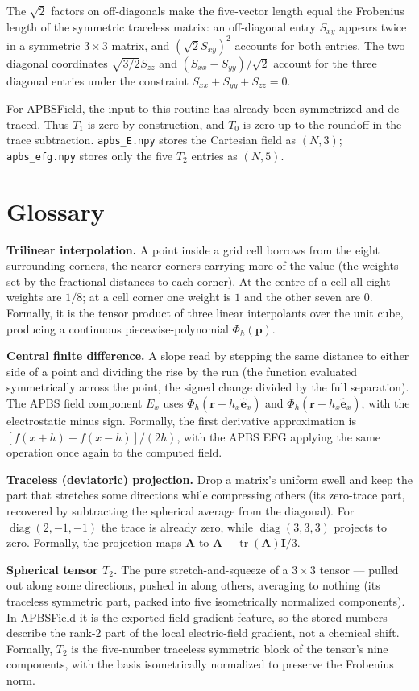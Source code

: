 \documentclass[11pt]{article}
\newcommand{\code}[1]{\texttt{#1}}
\begin{document}
The \(\sqrt2\) factors on off-diagonals make the five-vector length equal the
Frobenius length of the symmetric traceless matrix: an off-diagonal entry
\(S_{xy}\) appears twice in a symmetric \(3\times3\) matrix, and
\((\sqrt2 S_{xy})^2\) accounts for both entries. The two diagonal coordinates
\(\sqrt{3/2}S_{zz}\) and \((S_{xx}-S_{yy})/\sqrt2\) account for the three
diagonal entries under the constraint \(S_{xx}+S_{yy}+S_{zz}=0\).

For APBSField, the input to this routine has already been symmetrized and
de-traced. Thus \(T_1\) is zero by construction, and \(T_0\) is zero up to the
roundoff in the trace subtraction. \code{apbs\_E.npy} stores the Cartesian
field as \((N,3)\); \code{apbs\_efg.npy} stores only the five \(T_2\) entries as
\((N,5)\).

\section{Glossary}

\textbf{Trilinear interpolation.} A point inside a grid cell borrows from the
eight surrounding corners, the nearer corners carrying more of the value (the
weights set by the fractional distances to each corner). At the centre of a cell
all eight weights are \(1/8\); at a cell
corner one weight is \(1\) and the other seven are \(0\). Formally, it is the
tensor product of three linear interpolants over the unit cube, producing a
continuous piecewise-polynomial \(\Phi_h(\bm p)\).

\textbf{Central finite difference.} A slope read by stepping the same distance
to either side of a point and dividing the rise by the run (the function
evaluated symmetrically across the point, the signed change divided by the full
separation). The APBS field component \(E_x\) uses
\(\Phi_h(\bm r+h_x\hat{\bm e}_x)\) and
\(\Phi_h(\bm r-h_x\hat{\bm e}_x)\), with the electrostatic minus sign.
Formally, the first derivative approximation is
\([f(x+h)-f(x-h)]/(2h)\), with the APBS EFG applying the same operation once
again to the computed field.

\textbf{Traceless (deviatoric) projection.} Drop a matrix's uniform swell and
keep the part that stretches some directions while compressing others (its
zero-trace part, recovered by subtracting the spherical average from the
diagonal). For
\(\operatorname{diag}(2,-1,-1)\) the trace is already zero, while
\(\operatorname{diag}(3,3,3)\) projects to zero. Formally, the projection maps
\(\bm A\) to \(\bm A-\operatorname{tr}(\bm A)\bm I/3\).

\textbf{Spherical tensor \(T_2\).} The pure stretch-and-squeeze of a
\(3\times3\) tensor --- pulled out along some directions, pushed in along others,
averaging to nothing (its traceless symmetric part, packed into five
isometrically normalized components). In
APBSField it is the exported field-gradient feature, so the stored numbers
describe the rank-2 part of the local electric-field gradient, not a chemical
shift. Formally, \(T_2\) is the five-number traceless symmetric block of the
tensor's nine components, with the basis isometrically normalized to preserve
the Frobenius norm.
\end{document}
